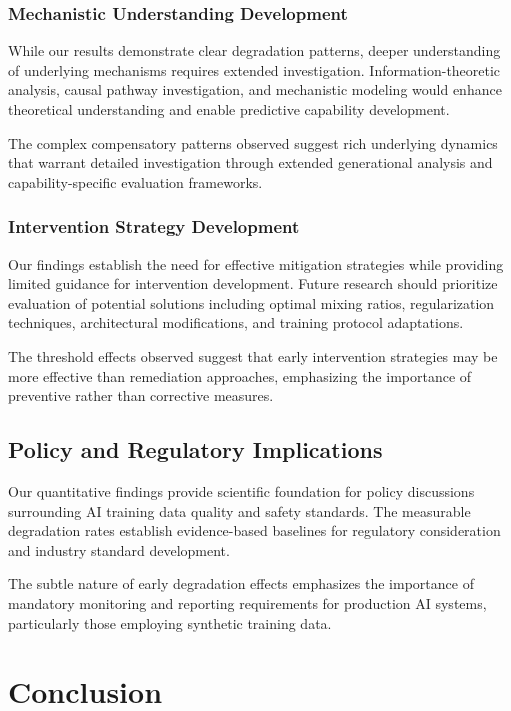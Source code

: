 \documentclass[11pt]{article}
\begin{document}
\subsubsection{Mechanistic Understanding Development}

While our results demonstrate clear degradation patterns, deeper understanding of underlying mechanisms requires extended investigation. Information-theoretic analysis, causal pathway investigation, and mechanistic modeling would enhance theoretical understanding and enable predictive capability development.

The complex compensatory patterns observed suggest rich underlying dynamics that warrant detailed investigation through extended generational analysis and capability-specific evaluation frameworks.

\subsubsection{Intervention Strategy Development}

Our findings establish the need for effective mitigation strategies while providing limited guidance for intervention development. Future research should prioritize evaluation of potential solutions including optimal mixing ratios, regularization techniques, architectural modifications, and training protocol adaptations.

The threshold effects observed suggest that early intervention strategies may be more effective than remediation approaches, emphasizing the importance of preventive rather than corrective measures.

\subsection{Policy and Regulatory Implications}

Our quantitative findings provide scientific foundation for policy discussions surrounding AI training data quality and safety standards. The measurable degradation rates establish evidence-based baselines for regulatory consideration and industry standard development.

The subtle nature of early degradation effects emphasizes the importance of mandatory monitoring and reporting requirements for production AI systems, particularly those employing synthetic training data.

\section{Conclusion}
\end{document}
